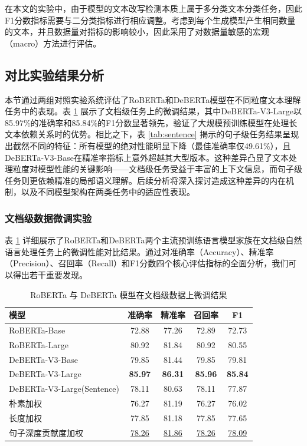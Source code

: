在本文的实验中，由于模型的文本改写检测本质上属于多分类文本分类任务，因此F1分数指标需要与二分类指标进行相应调整。考虑到每个生成模型产生相同数量的文本，并且数据量对指标的影响较小，因此采用了对数据量敏感的宏观（macro）方法进行评估。

\subsection{对比实验结果分析}
\label{sec:method-experiment-main}

本节通过两组对照实验系统评估了RoBERTa和DeBERTa模型在不同粒度文本理解任务中的表现。表 \ref{tab:document} 展示了文档级任务上的微调结果，其中DeBERTa-V3-Large以85.97\%的准确率和85.84\%的F1分数显著领先，验证了大规模预训练模型在处理长文本依赖关系时的优势。相比之下，表 \ref{tab:sentence} 揭示的句子级任务结果呈现出截然不同的特征：所有模型的绝对性能明显下降（最佳准确率仅49.61\%），且DeBERTa-V3-Base在精准率指标上意外超越其大型版本。这种差异凸显了文本处理粒度对模型性能的关键影响——文档级任务受益于丰富的上下文信息，而句子级任务则更依赖精准的局部语义理解。后续分析将深入探讨造成这种差异的内在机制，以及不同模型架构在两类任务中的适应性表现。

\subsubsection{文档级数据微调实验}

表 \ref{tab:document} 详细展示了RoBERTa和DeBERTa两个主流预训练语言模型家族在文档级自然语言处理任务上的微调性能对比结果。通过对准确率（Accuracy）、精准率（Precision）、召回率（Recall）和F1分数四个核心评估指标的全面分析，我们可以得出若干重要发现。

\begin{table}[htbp]
\caption{RoBERTa 与 DeBERTa 模型在文档级数据上微调结果}
\centering
\begin{tabular}{l|cccc}
\toprule
\textbf{模型}& \textbf{准确率}   & \textbf{精准率}    & \textbf{召回率}    & \textbf{F1}   \\ \midrule
RoBERTa-Base \cite{liu_roberta_2019}  & 72.88          & 77.26          & 72.89          & 72.73          \\
RoBERTa-Large \cite{liu_roberta_2019} & 80.92          & 81.84          & 80.92          & 80.55          \\
DeBERTa-V3-Base \cite{he2023debertav3improvingdebertausing} & 79.85          & 81.44          & 79.85          & 79.81          \\
DeBERTa-V3-Large \cite{he2023debertav3improvingdebertausing} & \textbf{85.97} & \textbf{86.31} & \textbf{85.96} & \textbf{85.84} \\ \midrule
DeBERTa-V3-Large\cite{he2023debertav3improvingdebertausing}(Sentence)  & 78.11 & 80.63 & 78.11 & 77.87 \\
朴素加权 & 76.27 & 81.19 & 76.27 & 76.02 \\
长度加权 & 77.85 & 81.18 & 77.85 & 77.65 \\
句子深度贡献度加权 & \uline{78.26} & \uline{81.86} & \uline{78.26} & \uline{78.09} \\ \bottomrule
\end{tabular}
\label{tab:document}
\end{table}


